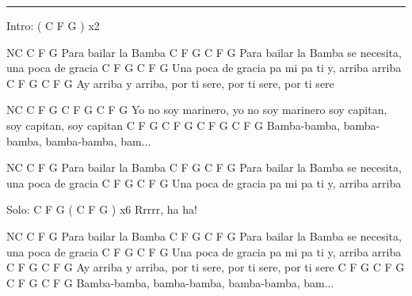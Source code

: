 \noindent\rule{\columnwidth}{1pt}

\begin{lstsong}
Intro:  ( C F G ) x2

NC              C   F G
Para bailar la Bamba
                C        F   G                  C   F G
Para bailar la Bamba se necesita, una poca de gracia
              C       F     G               C  F G
Una poca de gracia pa mi pa ti y, arriba arriba 
               C        F   G            C         F   G
Ay arriba y arriba, por ti sere, por ti sere, por ti sere

NC             C  F G               C        F   G            C        F   G
Yo no soy marinero,  yo no soy marinero soy capitan, soy capitan, soy capitan
 C  F  G      C  F  G      C  F  G      C  F  G
Bamba-bamba, bamba-bamba, bamba-bamba, bam...

NC              C   F G
Para bailar la Bamba
                C        F   G                  C   F G
Para bailar la Bamba se necesita, una poca de gracia
              C       F     G               C  F G
Una poca de gracia pa mi pa ti y, arriba arriba 

Solo: C F G               ( C F G ) x6
            Rrrrr, ha ha!

NC              C   F G
Para bailar la Bamba
                C        F   G                  C   F G
Para bailar la Bamba se necesita, una poca de gracia
              C       F     G               C  F G
Una poca de gracia pa mi pa ti y, arriba arriba 
               C        F   G            C         F   G
Ay arriba y arriba, por ti sere, por ti sere, por ti sere
 C  F  G      C  F  G      C  F  G      C  F  G
Bamba-bamba, bamba-bamba, bamba-bamba, bam...
\end{lstsong}
